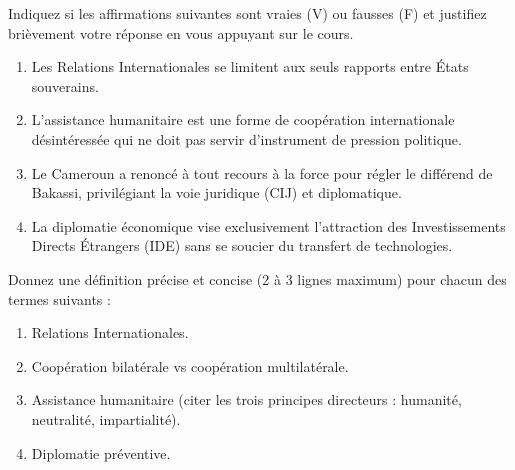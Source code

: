 \documentclass[11pt]{article}
\begin{document}
\begin{exercice}
Indiquez si les affirmations suivantes sont vraies (V) ou fausses (F) et justifiez brièvement votre réponse en vous appuyant sur le cours.
\begin{enumerate}
    \item Les Relations Internationales se limitent aux seuls rapports entre États souverains.
    \item L'assistance humanitaire est une forme de coopération internationale désintéressée qui ne doit pas servir d'instrument de pression politique.
    \item Le Cameroun a renoncé à tout recours à la force pour régler le différend de Bakassi, privilégiant la voie juridique (CIJ) et diplomatique.
    \item La diplomatie économique vise exclusivement l'attraction des Investissements Directs Étrangers (IDE) sans se soucier du transfert de technologies.
\end{enumerate}
\end{exercice}

\begin{exercice}
Donnez une définition précise et concise (2 à 3 lignes maximum) pour chacun des termes suivants :
\begin{enumerate}
    \item Relations Internationales.
    \item Coopération bilatérale vs coopération multilatérale.
    \item Assistance humanitaire (citer les trois principes directeurs : humanité, neutralité, impartialité).
    \item Diplomatie préventive.
\end{enumerate}
\end{exercice}
\end{document}

